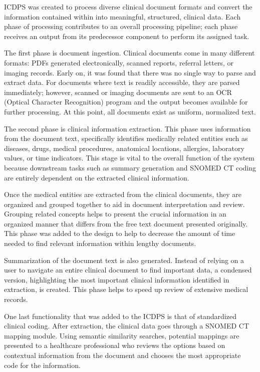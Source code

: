 ICDPS was created to process diverse clinical document formats and convert the information contained within into meaningful, structured, clinical data. Each phase of processing contributes to an overall processing pipeline; each phase receives an output from its predecessor component to perform its assigned task.

The first phase is document ingestion. Clinical documents come in many different formats: PDFs generated electronically, scanned reports, referral letters, or imaging records. Early on, it was found that there was no single way to parse and extract data. For documents where text is readily accessible, they are parsed immediately; however, scanned or imaging documents are sent to an OCR (Optical Character Recognition) program and the output becomes available for further processing. At this point, all documents exist as uniform, normalized text.

The second phase is clinical information extraction. This phase uses information from the document text, specifically identifies medically related entities such as diseases, drugs, medical procedures, anatomical locations, allergies, laboratory values, or time indicators. This stage is vital to the overall function of the system because downstream tasks such as summary generation and SNOMED CT coding are entirely dependent on the extracted clinical information.

Once the medical entities are extracted from the clinical documents, they are organized and grouped together to aid in document interpretation and review. Grouping related concepts helps to present the crucial information in an organized manner that differs from the free text document presented originally. This phase was added to the design to help to decrease the amount of time needed to find relevant information within lengthy documents.

Summarization of the document text is also generated. Instead of relying on a user to navigate an entire clinical document to find important data, a condensed version, highlighting the most important clinical information identified in extraction, is created. This phase helps to speed up review of extensive medical records.

One last functionality that was added to the ICDPS is that of standardized clinical coding. After extraction, the clinical data goes through a SNOMED CT mapping module. Using semantic similarity searches, potential mappings are presented to a healthcare professional who reviews the options based on contextual information from the document and chooses the most appropriate code for the information.

